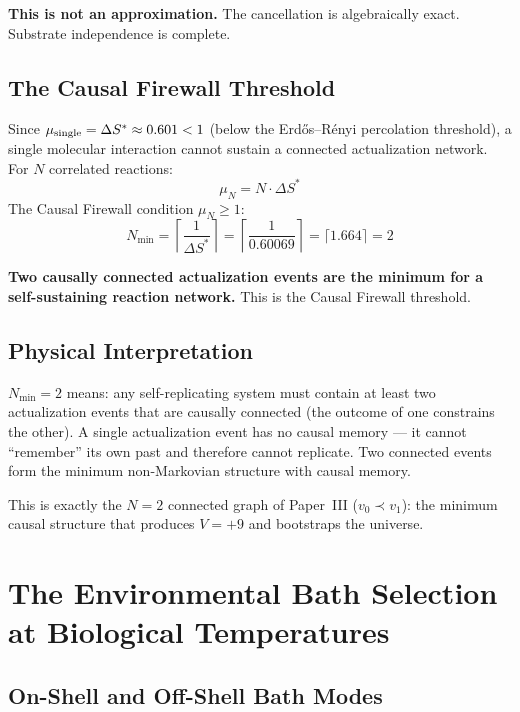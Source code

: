 \documentclass[12pt,a4paper]{article}
\begin{document}
\textbf{This is not an approximation.}  The cancellation is algebraically exact.  Substrate independence is complete.

\subsection{The Causal Firewall Threshold}

Since $\mu_{\rm single}=\Delta S^*\approx0.601<1$ (below the Erd\H{o}s--R\'enyi percolation threshold), a single molecular interaction cannot sustain a connected actualization network.  For $N$ correlated reactions:
\begin{equation}
  \mu_N = N\cdot\Delta S^*
\end{equation}
The Causal Firewall condition $\mu_N\geq1$:
\begin{equation}
  N_{\min} = \left\lceil\frac{1}{\Delta S^*}\right\rceil = \left\lceil\frac{1}{0.60069}\right\rceil = \lceil1.664\rceil = 2
  \label{eq:Nmin}
\end{equation}

\textbf{Two causally connected actualization events are the minimum for a self-sustaining reaction network.}  This is the Causal Firewall threshold.

\subsection{Physical Interpretation}

$N_{\min}=2$ means: any self-replicating system must contain at least two actualization events that are causally connected (the outcome of one constrains the other).  A single actualization event has no causal memory --- it cannot ``remember'' its own past and therefore cannot replicate.  Two connected events form the minimum non-Markovian structure with causal memory.

This is exactly the $N=2$ connected graph of Paper~III ($v_0\prec v_1$): the minimum causal structure that produces $V=+9$ and bootstraps the universe.

\section{The Environmental Bath Selection at Biological Temperatures}\label{sec:bath}

\subsection{On-Shell and Off-Shell Bath Modes}
\end{document}
